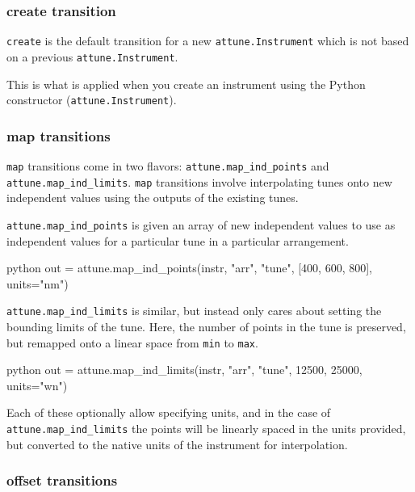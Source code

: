 \hypertarget{create-transition}{%
\subsubsection{create transition}\label{create-transition}}

\texttt{create} is the default transition for a new
\texttt{attune.Instrument} which is not based on a
previous \texttt{attune.Instrument}.

This is what is applied when you create an instrument using the Python
constructor (\texttt{attune.Instrument}).

\hypertarget{map-transitions}{%
\subsubsection{map transitions}\label{map-transitions}}

\texttt{map} transitions come in two flavors:
\texttt{attune.map\_ind\_points} and \texttt{attune.map\_ind\_limits}.
\texttt{map} transitions involve interpolating tunes onto new
independent values using the outputs of the existing tunes.

\texttt{attune.map\_ind\_points} is given an array of new independent
values to use as independent values for a particular tune in a
particular arrangement.

\begin{codefragment}{python}
out = attune.map_ind_points(instr, "arr", "tune", [400, 600, 800], units="nm")
\end{codefragment}

\texttt{attune.map\_ind\_limits} is similar, but instead only cares
about setting the bounding limits of the tune. Here, the number of
points in the tune is preserved, but remapped onto a linear space from
\texttt{min} to \texttt{max}.

\begin{codefragment}{python}
out = attune.map_ind_limits(instr, "arr", "tune", 12500, 25000, units="wn")
\end{codefragment}

Each of these optionally allow specifying units, and in the case of
\texttt{attune.map\_ind\_limits} the points will be linearly spaced in
the units provided, but converted to the native units of the instrument
for interpolation.

\hypertarget{offset-transitions}{%
\subsubsection{offset transitions}\label{offset-transitions}}

